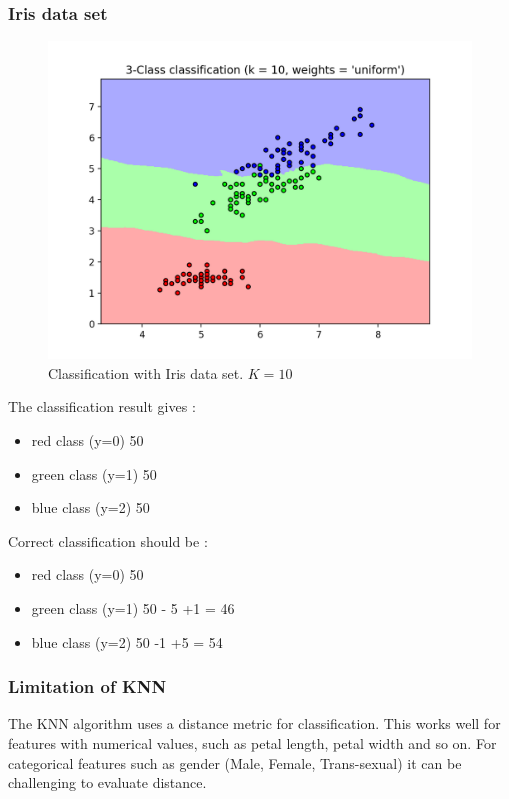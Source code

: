 \documentclass[11pt, oneside]{article}   	%
\begin{document}
\subsubsection{Iris data set}

\begin{figure}[H] %
   \centering
   \includegraphics[width=5in]{knn10.png} 
   \caption{Classification with Iris data set. $K=10$}
   \label{fig:example}
\end{figure}

The classification result gives :
\begin{itemize}
\item red class (y=0) 50 
\item green class (y=1) 50 
\item blue class (y=2) 50 
\end{itemize}

Correct classification should be :
\begin{itemize}
\item red class (y=0) 50 
\item green class (y=1) 50 - 5 +1 = 46
\item blue class (y=2) 50 -1 +5 = 54
\end{itemize}


\subsubsection{Limitation of KNN}
The KNN algorithm uses a distance metric for classification. This works well for features with numerical values, such as petal length, petal width and so on.
For categorical features such as gender (Male, Female, Trans-sexual) it can be challenging to evaluate distance.
\end{document}
